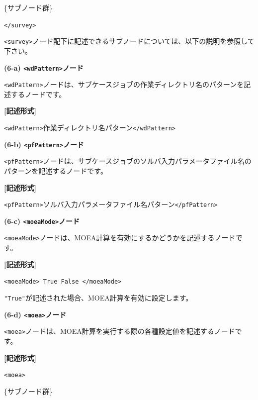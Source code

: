 \documentclass[a4paper,11pt]{jarticle}
\begin{document}
{\parindent=14pt
\{サブノード群\}

\parindent=0pt
\texttt{</survey>}

\vspace{8pt}
\leftskip=0pt
\texttt{<survey>}ノード配下に記述できるサブノードについては、以下の説明を参照して下さい。

\vspace{12pt}
\textbf{(6-a) \texttt{<wdPattern>}ノード}

\texttt{<wdPattern>}ノードは、サブケースジョブの作業ディレクトリ名のパターンを記述するノードです。

\vspace{8pt}
\leftskip=12pt
\textbf{[記述形式]}

\leftskip=42pt
\texttt{<wdPattern>}作業ディレクトリ名パターン\texttt{</wdPattern>}

\vspace{12pt}
\leftskip=0pt
\textbf{(6-b) \texttt{<pfPattern>}ノード}

\texttt{<pfPattern>}ノードは、サブケースジョブのソルバ入力パラメータファイル名のパターンを記述するノードです。

\vspace{8pt}
\leftskip=12pt
\textbf{[記述形式]}

\leftskip=42pt
\texttt{<pfPattern>}ソルバ入力パラメータファイル名パターン\texttt{</pfPattern>}

\vspace{12pt}
\leftskip=0pt
\textbf{(6-c) \texttt{<moeaMode>}ノード}

\texttt{<moeaMode>}ノードは、MOEA計算を有効にするかどうかを記述するノードです。

\vspace{8pt}
\leftskip=12pt
\textbf{[記述形式]}

\leftskip=42pt
\texttt{<moeaMode> True \textbar{} False </moeaMode>}

\vspace{8pt}
\leftskip=0pt
\texttt{"True"}が記述された場合、MOEA計算を有効に設定します。

\vspace{12pt}
\leftskip=0pt
\textbf{(6-d) \texttt{<moea>}ノード}

\texttt{<moea>}ノードは、MOEA計算を実行する際の各種設定値を記述するノードです。

\vspace{8pt}
\leftskip=12pt
\textbf{[記述形式]}

\leftskip=42pt
\texttt{<moea>}

\parindent=14pt
\{サブノード群\}

}
\end{document}
